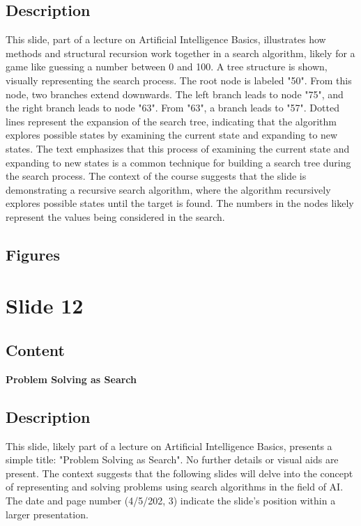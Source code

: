 \documentclass{article}%
\begin{document}
\subsection{Description}%
This slide, part of a lecture on Artificial Intelligence Basics, illustrates how methods and structural recursion work together in a search algorithm, likely for a game like guessing a number between 0 and 100.  A tree structure is shown, visually representing the search process.  The root node is labeled "50".  From this node, two branches extend downwards.  The left branch leads to node "75", and the right branch leads to node "63".  From "63", a branch leads to "57".  Dotted lines represent the expansion of the search tree, indicating that the algorithm explores possible states by examining the current state and expanding to new states.  The text emphasizes that this process of examining the current state and expanding to new states is a common technique for building a search tree during the search process.  The context of the course suggests that the slide is demonstrating a recursive search algorithm, where the algorithm recursively explores possible states until the target is found. The numbers in the nodes likely represent the values being considered in the search.%
\subsection{Figures}%
\begin{figure}[H]%
\centering%
\end{figure}

%
\newpage%
\section{Slide 12}%
\label{sec:Slide12}%
\subsection{Content}%

\textbf{Problem Solving as Search}
%
\subsection{Description}%
This slide, likely part of a lecture on Artificial Intelligence Basics, presents a simple title: "Problem Solving as Search".  No further details or visual aids are present.  The context suggests that the following slides will delve into the concept of representing and solving problems using search algorithms in the field of AI.  The date and page number (4/5/202, 3) indicate the slide's position within a larger presentation.%
\end{document}
